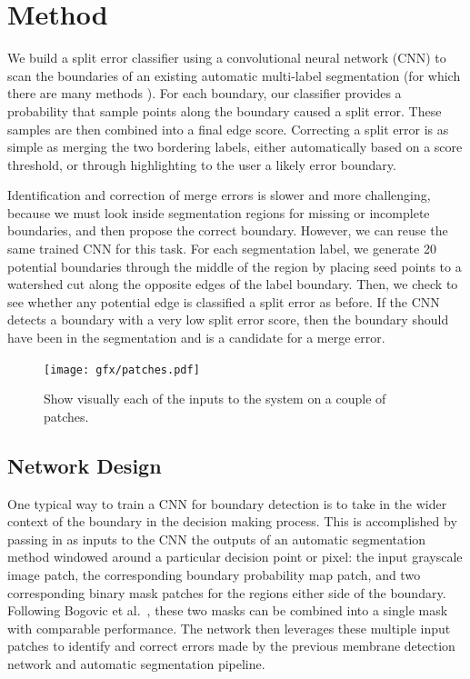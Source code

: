 \section{Method}
We build a split error classifier using a convolutional neural network (CNN) to scan the boundaries of an existing automatic multi-label segmentation (for which there are many methods \cite{jain2010,kaynig13,Liu2014,NunezIglesias2013Machine,GALA2014,amelio_segmentation}). For each boundary, our classifier provides a probability that sample points along the boundary caused a split error. These samples are then combined into a final edge score. Correcting a split error is as simple as merging the two bordering labels, either automatically based on a score threshold, or through highlighting to the user a likely error boundary.

Identification and correction of merge errors is slower and more challenging, because we must look inside segmentation regions for missing or incomplete boundaries, and then propose the correct boundary. However, we can reuse the same trained CNN for this task. For each segmentation label, we generate 20 potential boundaries through the middle of the region by placing seed points to a watershed cut along the opposite edges of the label boundary. Then, we check to see whether any potential edge is classified a split error as before. If the CNN detects a boundary with a very low split error score, then the boundary should have been in the segmentation and is a candidate for a merge error.

\begin{figure}[t]
\centering
\texttt{[image: gfx/patches.pdf]}
\caption{Show visually each of the inputs to the system on a couple of patches.}
\end{figure}


\subsection{Network Design}
One typical way to train a CNN for boundary detection is to take in the wider context of the boundary in the decision making process. This is accomplished by passing in as inputs to the CNN the outputs of an automatic segmentation method windowed around a particular decision point or pixel: the input grayscale image patch, the corresponding boundary probability map patch, and two corresponding binary mask patches for the regions either side of the boundary. Following Bogovic et al.~\cite{BogovicHJ13}, these two masks can be combined into a single mask with comparable performance. The network then leverages these multiple input patches to identify and correct errors made by the previous membrane detection network and automatic segmentation pipeline.

